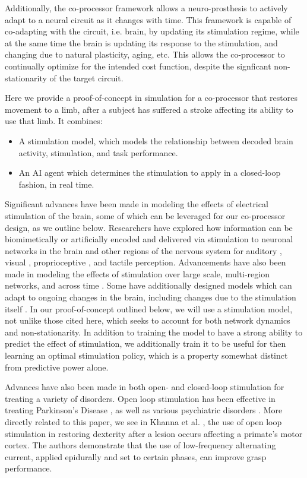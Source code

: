 \documentclass[12pt]{iopart}
\begin{document}
Additionally, the co-processor framework allows a neuro-prosthesis to actively adapt to
a neural circuit as it changes with time. This framework is capable of co-adapting with
the circuit, i.e. brain, by updating its stimulation regime, while at the same time the
brain is updating its response to the stimulation, and changing due to natural plasticity,
aging, etc. This allows the co-processor to continually optimize for the intended cost
function, despite the signficant non-stationarity of the target circuit.

Here we provide a proof-of-concept in simulation for a co-processor that restores
movement to a limb, after a subject has suffered a stroke affecting its ability to
use that limb. It combines:
\begin{itemize}
	\item A stimulation model, which models the relationship between decoded brain activity,
	      stimulation, and task performance.
	\item An AI agent which determines the stimulation to apply in a closed-loop fashion, in real time.
\end{itemize}

Significant advances have been made in modeling the effects of electrical stimulation
of the brain, some of which can be leveraged for our co-processor design, as we outline
below. Researchers have explored how information can be biomimetically or
artificially encoded and delivered via stimulation to neuronal networks in the brain and
other regions of the nervous system for auditory \cite{niparko.cochlear}, visual \cite{weiland.retinal},
proprioceptive \cite{tomlinson.propr}, and tactile
\cite{tabot.tact, tyler.tact, dadarlat.tact, sharlene.tact, cronin.tact} perception.
Advancements have also been made in modeling the effects of stimulation over large scale, multi-region
networks, and across time \cite{shanechi.stimmodel}. Some have additionally designed models which
can adapt to ongoing changes in the brain, including changes due to the stimulation itself
\cite{tafazoli.acls}. In our proof-of-concept outlined below, we will use a stimulation
model, not unlike those cited here, which seeks to account for both network dynamics
and non-stationarity. In addition to training the model to have a strong ability to predict
the effect of stimulation, we additionally train it to be useful for then learning an
optimal stimulation policy, which is a property somewhat distinct from predictive
power alone.

Advances have also been made in both open- and closed-loop stimulation for
treating a variety of disorders. Open loop stimulation has been effective in
treating Parkinson's Disease \cite{benabid.parkinsons}, as well as various
psychiatric disorders \cite{holtzheimer.psy, kisely.psy, fraint.psy}.
More directly related to this paper, we see in Khanna et al. \cite{khanna.openloop},
the use of open loop stimulation in restoring dexterity after a lesion
occurs affecting a primate's motor cortex. The authors demonstrate that
the use of low-frequency alternating current, applied epidurally and set to
certain phases, can improve grasp performance.
\end{document}
